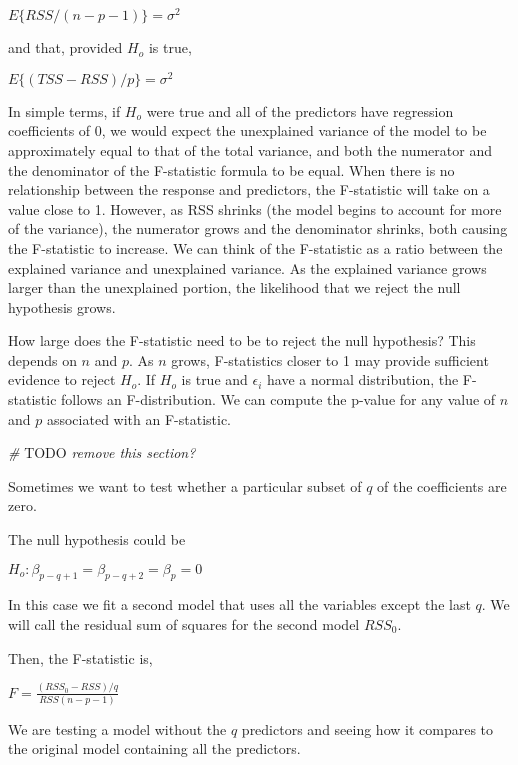 \documentclass[]{book}
\newenvironment{Shaded}{\begin{snugshade}}{\end{snugshade}}
\newcommand{\AlertTok}[1]{\textcolor[rgb]{0.94,0.16,0.16}{#1}}
\newcommand{\CommentTok}[1]{\textcolor[rgb]{0.56,0.35,0.01}{\textit{#1}}}
\begin{document}
\(E\{RSS/(n-p-1)\} = \sigma^2\)

and that, provided \(H_o\) is true,

\(E\{(TSS-RSS)/p\} = \sigma^2\)

In simple terms, if \(H_o\) were true and all of the predictors have regression coefficients of 0, we would expect the unexplained variance of the model to be approximately equal to that of the total variance, and both the numerator and the denominator of the F-statistic formula to be equal. When there is no relationship between the response and predictors, the F-statistic will take on a value close to 1. However, as RSS shrinks (the model begins to account for more of the variance), the numerator grows and the denominator shrinks, both causing the F-statistic to increase. We can think of the F-statistic as a ratio between the explained variance and unexplained variance. As the explained variance grows larger than the unexplained portion, the likelihood that we reject the null hypothesis grows.

How large does the F-statistic need to be to reject the null hypothesis? This depends on \(n\) and \(p\). As \(n\) grows, F-statistics closer to 1 may provide sufficient evidence to reject \(H_o\). If \(H_o\) is true and \(\epsilon_i\) have a normal distribution, the F-statistic follows an F-distribution. We can compute the p-value for any value of \(n\) and \(p\) associated with an F-statistic.

\begin{Shaded}
\begin{Highlighting}[]
\CommentTok{# }\AlertTok{TODO}\CommentTok{ remove this section?}
\end{Highlighting}
\end{Shaded}

Sometimes we want to test whether a particular subset of \(q\) of the coefficients are zero.

The null hypothesis could be

\(H_o : \beta_{p-q+1} = \beta_{p-q+2} = \beta_p = 0\)

In this case we fit a second model that uses all the variables except the last \(q\). We will call the residual sum of squares for the second model \(RSS_0\).

Then, the F-statistic is,

\(F = \frac{(RSS_0 - RSS)/q}{RSS(n-p-1)}\)

We are testing a model without the \(q\) predictors and seeing how it compares to the original model containing all the predictors.
\end{document}
